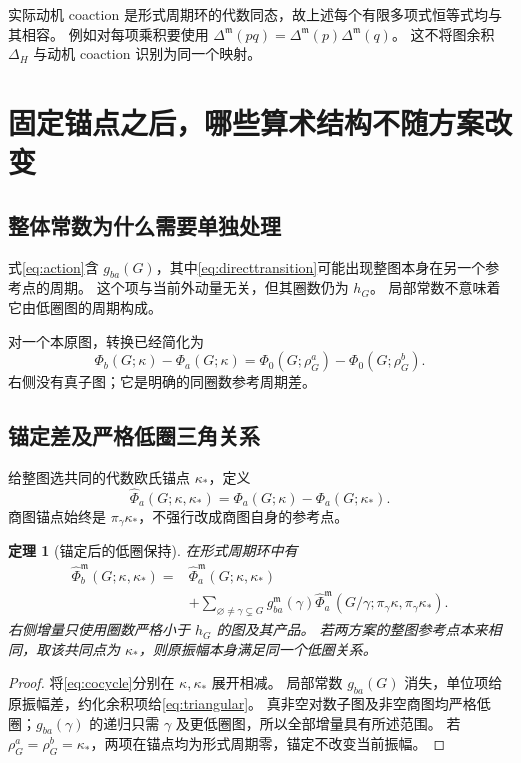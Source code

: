 \documentclass[11pt,a4paper]{ctexart}
\theoremstyle{cnplain}
\newtheorem{theorem}{定理}[section]
\theoremstyle{remark}\newtheorem{remark}[theorem]{注}
\begin{document}
实际动机 coaction 是形式周期环的代数同态，故上述每个有限多项式恒等式均与其相容。
例如对每项乘积要使用 $\Delta^{\mathfrak m}(pq)=\Delta^{\mathfrak m}(p)\Delta^{\mathfrak m}(q)$。
这不将图余积 $\Delta_H$ 与动机 coaction 识别为同一个映射。

\section{固定锚点之后，哪些算术结构不随方案改变}
\subsection{整体常数为什么需要单独处理}
式\eqref{eq:action}含 $g_{ba}(G)$，其中\eqref{eq:directtransition}可能出现整图本身在另一个参考点的周期。
这个项与当前外动量无关，但其圈数仍为 $h_G$。
局部常数不意味着它由低圈图的周期构成。

对一个本原图，转换已经简化为
\begin{equation}\label{eq:primitive}
 \Phi_b(G;\kappa)-\Phi_a(G;\kappa)
   =\Phi_0(G;\rho_G^a)-\Phi_0(G;\rho_G^b).
\end{equation}
右侧没有真子图；它是明确的同圈数参考周期差。

\subsection{锚定差及严格低圈三角关系}
给整图选共同的代数欧氏锚点 $\kappa_*$，定义
\begin{equation}\label{eq:anchor}
 \widehat\Phi_a(G;\kappa,\kappa_*)
       =\Phi_a(G;\kappa)-\Phi_a(G;\kappa_*).
\end{equation}
商图锚点始终是 $\pi_\gamma\kappa_*$，不强行改成商图自身的参考点。

\begin{theorem}[锚定后的低圈保持]\label{thm:anchor}
在形式周期环中有
\begin{align}\label{eq:triangular}
 \widehat\Phi_b^{\mathfrak m}(G;\kappa,\kappa_*)
 ={}&\widehat\Phi_a^{\mathfrak m}(G;\kappa,\kappa_*)\nonumber\\
 &+\sum_{\varnothing\ne\gamma\subsetneq G}
 g_{ba}^{\mathfrak m}(\gamma)
 \widehat\Phi_a^{\mathfrak m}
       (G/\gamma;\pi_\gamma\kappa,\pi_\gamma\kappa_*).
\end{align}
右侧增量只使用圈数严格小于 $h_G$ 的图及其产品。
若两方案的整图参考点本来相同，取该共同点为 $\kappa_*$，则原振幅本身满足同一个低圈关系。
\end{theorem}
\begin{proof}
将\eqref{eq:cocycle}分别在 $\kappa,\kappa_*$ 展开相减。
局部常数 $g_{ba}(G)$ 消失，单位项给原振幅差，约化余积项给\eqref{eq:triangular}。
真非空对数子图及非空商图均严格低圈；$g_{ba}(\gamma)$ 的递归只需 $\gamma$ 及更低圈图，所以全部增量具有所述范围。
若 $\rho_G^a=\rho_G^b=\kappa_*$，两项在锚点均为形式周期零，锚定不改变当前振幅。
\end{proof}
\end{document}
